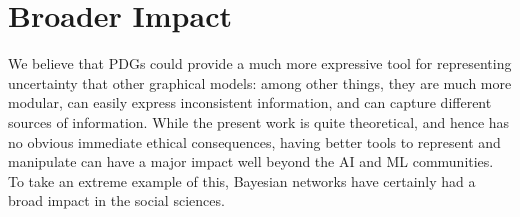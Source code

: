 \documentclass{article}
\theoremstyle{plain}
\theoremstyle{definition}
\theoremstyle{remark}
\newcommand{\commentout}[1]{\ignorespaces}
\numberwithin{equation}{section}
\begin{document}
	\section*{Broader Impact}
        \commentout{
	This work is theoretical enough not to have the ethical considerations attached to working with data to solve a particular problem, and party in particular will directly benefit in a forseeable way from this research.
	
	Nonetheless, we pursue this direction of inquiry largly because we believe that inconsitency has been under-valued; we hope that this work will provide a small push towards the practice of building more robust systems, which are less overfit not only to the data they are given, but also the representation at hand.
                }
We believe that PDGs could provide a much more expressive tool for
representing uncertainty that other graphical models: among other
things, they are much more modular, can easily express inconsistent
information, and can capture different sources of information.  While
the present work is quite theoretical, and hence has no obvious immediate
ethical consequences, having better tools to represent and manipulate
can have a major impact well beyond the AI and ML communities.  To
take an extreme example of this, Bayesian networks have certainly had
a broad impact in the social sciences.  
        
	\begin{ack}
	\end{ack}

	{
		\small
		

    	         
	}
	\onecolumn
\end{document}
